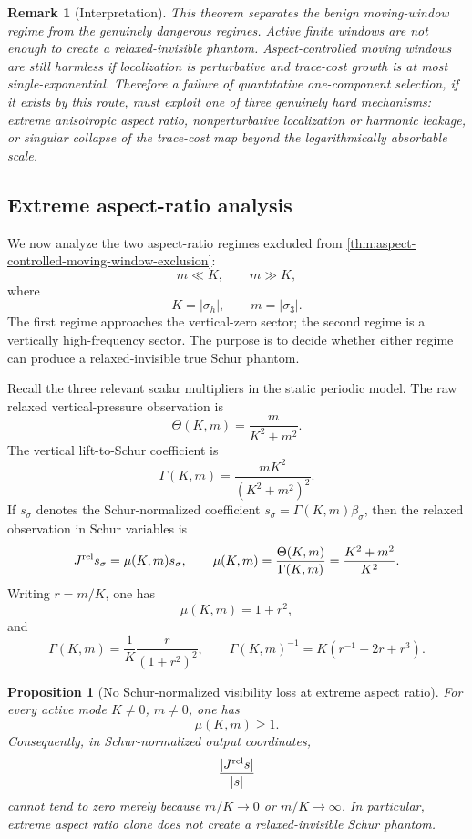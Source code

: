 \documentclass[11pt]{article}
\numberwithin{equation}{section}
\newtheorem{proposition}[theorem]{Proposition}
\newtheorem{remark}[theorem]{Remark}
\begin{document}
\begin{remark}[Interpretation]
This theorem separates the benign moving-window regime from the genuinely dangerous regimes.  Active finite windows are not enough to create a relaxed-invisible phantom.  Aspect-controlled moving windows are still harmless if localization is perturbative and trace-cost growth is at most single-exponential.  Therefore a failure of quantitative one-component selection, if it exists by this route, must exploit one of three genuinely hard mechanisms: extreme anisotropic aspect ratio, nonperturbative localization or harmonic leakage, or singular collapse of the trace-cost map beyond the logarithmically absorbable scale.
\end{remark}

\subsection{Extreme aspect-ratio analysis}\label{subsec:extreme-aspect-ratio-analysis}

We now analyze the two aspect-ratio regimes excluded from \cref{thm:aspect-controlled-moving-window-exclusion}:
\[
        m\ll K,
        \qquad
        m\gg K,
\]
where
\[
        K=|\sigma_h|,
        \qquad
        m=|\sigma_3|.
\]
The first regime approaches the vertical-zero sector; the second regime is a vertically high-frequency sector.  The purpose is to decide whether either regime can produce a relaxed-invisible true Schur phantom.

Recall the three relevant scalar multipliers in the static periodic model.  The raw relaxed vertical-pressure observation is
\[
        \Theta(K,m)=\frac{m}{K^2+m^2}.
\]
The vertical lift-to-Schur coefficient is
\[
        \Gamma(K,m)=\frac{mK^2}{(K^2+m^2)^2}.
\]
If \(s_\sigma\) denotes the Schur-normalized coefficient \(s_\sigma=\Gamma(K,m)\beta_\sigma\), then the relaxed observation in Schur variables is
\[
        J^{\rm rel}s_\sigma=\mu(K,m)s_\sigma,
        \qquad
        \mu(K,m)=\frac{\Theta(K,m)}{\Gamma(K,m)}=
\frac{K^2+m^2}{K^2}.
\]
Writing \(r=m/K\), one has
\[
        \mu(K,m)=1+r^2,
\]
and
\[
        \Gamma(K,m)=\frac1K\frac{r}{(1+r^2)^2},
        \qquad
        \Gamma(K,m)^{-1}=K\left(r^{-1}+2r+r^3\right).
\]

\begin{proposition}[No Schur-normalized visibility loss at extreme aspect ratio]\label{prop:no-schur-normalized-visibility-loss-extreme-aspect}
For every active mode \(K\neq0\), \(m\neq0\), one has
\[
        \mu(K,m)\ge1.
\]
Consequently, in Schur-normalized output coordinates,
\[
        \frac{|J^{\rm rel}s|}{|s|}
\]
cannot tend to zero merely because \(m/K\to0\) or \(m/K\to\infty\).  In particular, extreme aspect ratio alone does not create a relaxed-invisible Schur phantom.
\end{proposition}
\end{document}
